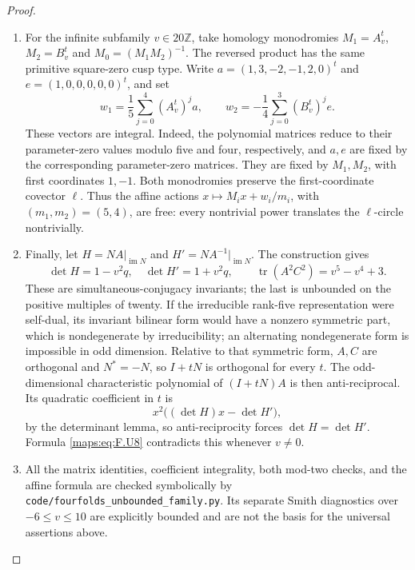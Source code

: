\documentclass[11pt,a4paper]{article}
\theoremstyle{definition}
\begin{document}
\begin{proof}
\begin{enumerate}[label=\arabic*.]
\item For the infinite subfamily $v\in20\mathbb Z$, take homology
monodromies $M_1=A_v^t$, $M_2=B_v^t$ and
$M_0=(M_1M_2)^{-1}$.  The reversed product has the same
primitive square-zero cusp type.  Write
$a=(1,3,-2,-1,2,0)^t$ and $e=(1,0,0,0,0,0)^t$, and set
\[
 w_1=\frac15\sum_{j=0}^4(A_v^t)^j a,
 \qquad
 w_2=-\frac14\sum_{j=0}^3(B_v^t)^j e.
 \tag{F.U7}\label{maps:eq:F.U7}
\]
These vectors are integral.  Indeed, the polynomial matrices
reduce to their parameter-zero values modulo five and four,
respectively, and $a,e$ are fixed by the corresponding
parameter-zero matrices.  They are fixed by $M_1,M_2$, with
first coordinates $1,-1$.  Both monodromies preserve the
first-coordinate covector $\ell$.  Thus the affine actions
$x\mapsto M_i x+w_i/m_i$, with $(m_1,m_2)=(5,4)$, are free:
every nontrivial power translates the $\ell$-circle nontrivially.

\item Finally, let $H=NA|_{\operatorname{im}N}$ and
$H'=NA^{-1}|_{\operatorname{im}N}$.  The construction gives
\[
 \det H=1-v^2q,\quad \det H'=1+v^2q,
 \qquad\operatorname{tr}(A^2C^2)=v^5-v^4+3.
 \tag{F.U8}\label{maps:eq:F.U8}
\]
These are simultaneous-conjugacy invariants; the last is
unbounded on the positive multiples of twenty.  If the
irreducible rank-five representation were self-dual, its
invariant bilinear form would have a nonzero symmetric part,
which is nondegenerate by irreducibility; an alternating
nondegenerate form is impossible in odd dimension.  Relative
to that symmetric form, $A,C$ are orthogonal and
$N^*=-N$, so $I+tN$ is orthogonal for every $t$.
The odd-dimensional characteristic polynomial of $(I+tN)A$
is then anti-reciprocal.  Its quadratic coefficient in $t$ is
\[
 x^2\bigl((\det H)x-\det H'\bigr),
\]
by the determinant lemma, so anti-reciprocity forces
$\det H=\det H'$.  Formula \eqref{maps:eq:F.U8} contradicts this whenever
$v\ne0$.

\item All the matrix identities, coefficient integrality, both
mod-two checks, and the affine formula are checked symbolically
by \texttt{code/fourfolds\_unbounded\_family.py}.  Its separate
Smith diagnostics over $-6\le v\le10$ are explicitly bounded
and are not the basis for the universal assertions above.

\end{enumerate}
\end{proof}
\end{document}
